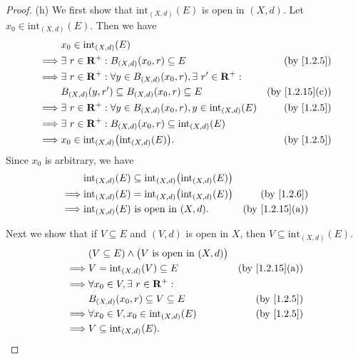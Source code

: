 \begin{proof}{(h)}
  We first show that \(\text{int}_{(X, d)}(E)\) is open in \((X, d)\).
  Let \(x_0 \in \text{int}_{(X, d)}(E)\).
  Then we have
  \begin{align*}
             & x_0 \in \text{int}_{(X, d)}(E)                                                                                      \\
    \implies & \exists\ r \in \R^+ : B_{(X, d)}(x_0, r) \subseteq E                                 & \text{(by \cref{1.2.5})}     \\
    \implies & \exists\ r \in \R^+ : \forall y \in B_{(X, d)}(x_0, r), \exists\ r' \in \R^+ :                                      \\
             & B_{(X, d)}(y, r') \subseteq B_{(X, d)}(x_0, r) \subseteq E                           & \text{(by \cref{1.2.15}(c))} \\
    \implies & \exists\ r \in \R^+ : \forall y \in B_{(X, d)}(x_0, r), y \in \text{int}_{(X, d)}(E) & \text{(by \cref{1.2.5})}     \\
    \implies & \exists\ r \in \R^+ : B_{(X, d)}(x_0, r) \subseteq \text{int}_{(X, d)}(E)                                           \\
    \implies & x_0 \in \text{int}_{(X, d)}\big(\text{int}_{(X, d)}(E)\big).                         & \text{(by \cref{1.2.5})}
  \end{align*}
  Since \(x_0\) is arbitrary, we have
  \begin{align*}
             & \text{int}_{(X, d)}(E) \subseteq \text{int}_{(X, d)}\big(\text{int}_{(X, d)}(E)\big)                                \\
    \implies & \text{int}_{(X, d)}(E) = \text{int}_{(X, d)}\big(\text{int}_{(X, d)}(E)\big)         & \text{(by \cref{1.2.6})}     \\
    \implies & \text{int}_{(X, d)}(E) \text{ is open in } (X, d).                                   & \text{(by \cref{1.2.15}(a))}
  \end{align*}

  Next we show that if \(V \subseteq E\) and \((V, d)\) is open in \(X\), then \(V \subseteq \text{int}_{(X, d)}(E)\).
  \begin{align*}
             & (V \subseteq E) \land \big(V \text{ is open in } (X, d)\big)                                \\
    \implies & V = \text{int}_{(X, d)}(V) \subseteq E                       & \text{(by \cref{1.2.15}(a))} \\
    \implies & \forall x_0 \in V, \exists\ r \in \R^+ :                                                    \\
             & B_{(X, d)}(x_0, r) \subseteq V \subseteq E                   & \text{(by \cref{1.2.5})}     \\
    \implies & \forall x_0 \in V, x_0 \in \text{int}_{(X, d)}(E)            & \text{(by \cref{1.2.5})}     \\
    \implies & V \subseteq \text{int}_{(X, d)}(E).
  \end{align*}


\end{proof}

